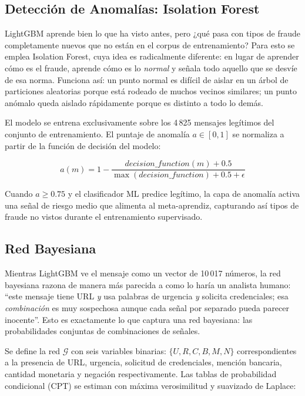 \documentclass{llncs}
\begin{document}
\subsection{Detección de Anomalías: Isolation Forest}
\label{sec:ml:iforest}

LightGBM aprende bien lo que ha visto antes, pero ¿qué pasa con
tipos de fraude completamente nuevos que no están en el corpus
de entrenamiento?
Para esto se emplea Isolation Forest, cuya idea es radicalmente
diferente: en lugar de aprender cómo es el fraude, aprende cómo
es lo \emph{normal} y señala todo aquello que se desvíe de esa norma.
Funciona así: un punto normal es difícil de aislar en un árbol de
particiones aleatorias porque está rodeado de muchos vecinos similares;
un punto anómalo queda aislado rápidamente porque es distinto a todo
lo demás.

El modelo se entrena exclusivamente sobre los 4\,825 mensajes
legítimos del conjunto de entrenamiento.
El puntaje de anomalía $a \in [0,1]$ se normaliza a partir de
la función de decisión del modelo:

\begin{equation}
  a(m) = 1 - \frac{\textit{decision\_function}(m) + 0.5}
                   {\max(\textit{decision\_function}) + 0.5 + \epsilon}
\end{equation}

Cuando $a \geq 0.75$ y el clasificador ML predice legítimo,
la capa de anomalía activa una señal de riesgo medio que alimenta
al meta-aprendiz, capturando así tipos de fraude no vistos durante
el entrenamiento supervisado.

\subsection{Red Bayesiana}
\label{sec:ml:bayes}

Mientras LightGBM ve el mensaje como un vector de 10\,017 números,
la red bayesiana razona de manera más parecida a como lo haría
un analista humano: ``este mensaje tiene URL \emph{y} usa palabras
de urgencia \emph{y} solicita credenciales; esa \emph{combinación}
es muy sospechosa aunque cada señal por separado pueda parecer
inocente''.
Esto es exactamente lo que captura una red bayesiana: las
probabilidades conjuntas de combinaciones de señales.

Se define la red $\mathcal{G}$ con seis variables binarias:
$\{U, R, C, B, M, N\}$ correspondientes a la presencia
de URL, urgencia, solicitud de credenciales, mención bancaria,
cantidad monetaria y negación respectivamente.
Las tablas de probabilidad condicional (CPT) se estiman con
máxima verosimilitud y suavizado de Laplace:
\end{document}
